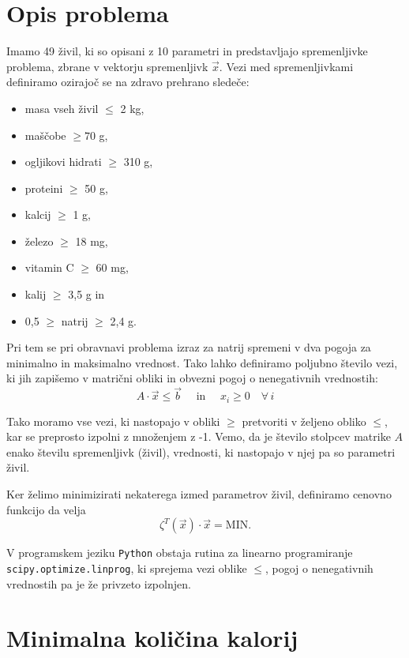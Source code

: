 \section{Opis problema}

Imamo 49 živil, ki so opisani z 10 parametri in predstavljajo spremenljivke problema, zbrane v vektorju spremenljivk $\Vec{x}$. Vezi med spremenljivkami definiramo ozirajoč se na zdravo prehrano sledeče:
\begin{itemize}
    \item masa vseh živil $\leq$ 2 kg,
    \item maščobe $\geq 70$ g,
    \item ogljikovi hidrati $\geq$ 310 g,
    \item proteini $\geq$ 50 g,
    \item kalcij $\geq$ 1 g,
    \item železo $\geq$ 18 mg,
    \item vitamin C $\geq$ 60 mg,
    \item kalij $\geq$ 3,5 g in
    \item 0,5 $\geq$ natrij $\geq$ 2,4 g.
\end{itemize}

Pri tem se pri obravnavi problema izraz za natrij spremeni v dva pogoja za minimalno in maksimalno vrednost. Tako lahko definiramo poljubno število vezi, ki jih zapišemo v matrični obliki in obvezni pogoj o nenegativnih vrednostih:
$$A \cdot \vec{x} \leq \vec{b} \quad \text{ in } \quad x_i \geq 0 \quad \forall \,i$$

Tako moramo vse vezi, ki nastopajo v obliki $\geq$ pretvoriti v željeno obliko $\leq$, kar se preprosto izpolni z množenjem z -1. Vemo, da je število stolpcev matrike $A$ enako številu spremenljivk (živil), vrednosti, ki nastopajo v njej pa so parametri živil.

Ker želimo minimizirati nekaterega izmed parametrov živil, definiramo cenovno funkcijo da velja 
$$\zeta^T(\vec{x}) \cdot \vec{x} = \text{MIN.}$$

V programskem jeziku \texttt{Python} obstaja rutina za linearno programiranje \linebreak \texttt{scipy.optimize.linprog}, ki sprejema vezi oblike $\leq$, pogoj o nenegativnih vrednostih pa je že privzeto izpolnjen.

\section{Minimalna količina kalorij}

